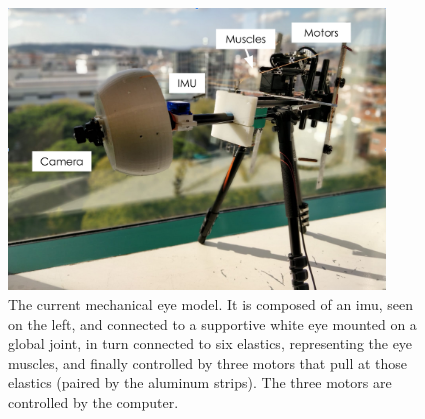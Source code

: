 \begin{figure}[ht]
	\centering
	\includegraphics[width=10cm]{images/prototypenew.png}
	\caption[Current mechanical eye model]{The current mechanical eye model. It is composed of an  \acrshort{imu}, seen on the left, and connected to a supportive white eye mounted on a global joint, in turn connected to six elastics, representing the eye muscles, and finally controlled by three motors that pull at those elastics (paired by the aluminum strips). The three motors are controlled by the computer.}
	\label{cha1:sec1:fig:curr_eye_model}
\end{figure}

